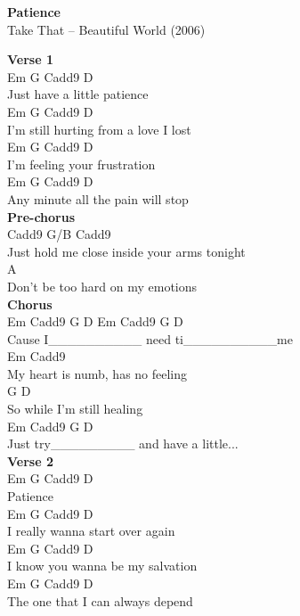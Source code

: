 \documentclass[a4paper]{article}
\begin{document}
    \begin{center}
        \textbf{Patience}
        ~\\
        Take That -- Beautiful World (2006)
    \end{center}
    {
        \scriptsize
        \textbf{Verse 1}
        ~\\
        {
            \cutive
            \obeyspaces
                   Em   G  Cadd9 D
\\
Just have a little patience
\\
                       Em G     Cadd9   D
\\
I'm still hurting from a love I lost
\\
                 Em     G    Cadd9 D
\\
I'm feeling your frustration
\\
               Em   G        Cadd9    D
\\
Any minute all the pain will stop
\\

        }
        \textbf{Pre-chorus}
        ~\\
        {
            \cutive
            \obeyspaces
         Cadd9           G/B                Cadd9
\\
Just hold me close inside your arms tonight
\\
                     A
\\
Don't be too hard on my emotions
\\

        }
        \textbf{Chorus}
        ~\\
        {
            \cutive
            \obeyspaces
      Em Cadd9 G D      Em Cadd9 G D
\\
Cause I\_\_\_\_\_\_\_\_\_\_ need ti\_\_\_\_\_\_\_\_\_\_me
\\
            Em            Cadd9
\\
My heart is numb, has no feeling
\\
   G               D
\\
So while I'm still healing
\\
     Em Cadd9 G D
\\
Just try\_\_\_\_\_\_\_\_\_ and have a little...
\\

        }
        \textbf{Verse 2}
        ~\\
        {
            \cutive
            \obeyspaces
Em   G  Cadd9 D
\\
Patience
\\
                  Em   G     Cadd9   D
\\
I really wanna start over again
\\
                    Em     G  Cadd9  D
\\
I know you wanna be my salvation
\\
                   Em   G    Cadd9    D
\\
The one that I can always depend
\\

}}
\end{document}
